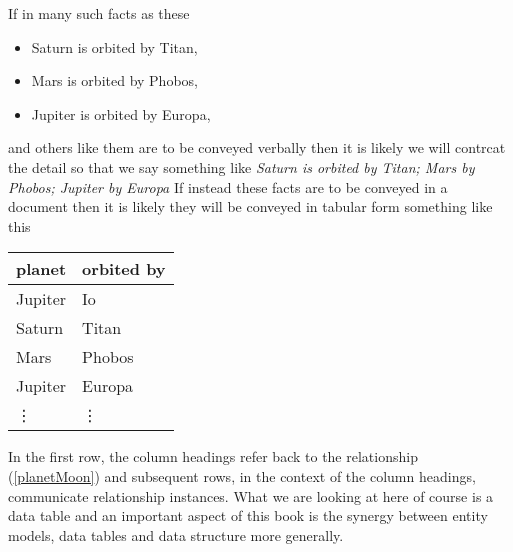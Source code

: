 If in  many such facts as these
\begin{itemize}
\renewcommand\labelitemi{--} 
\item Saturn is orbited by Titan, 
\item Mars is orbited by Phobos, 
\item Jupiter is orbited by Europa,
\end{itemize}
and others like them are to be conveyed verbally then it is likely we will contrcat the detail so that we say something like
\textit{Saturn is orbited by Titan; Mars by Phobos; Jupiter by Europa}
If instead  these facts are to be conveyed in a document then
it is likely they will be conveyed in tabular form something like this
\begin{center}
\begin{tabular}{|l | l|}
\hline
planet & orbited by \\
\hline\hline
Jupiter  & Io \\
\hline
Saturn   & Titan    \\
\hline
Mars     & Phobos    \\
\hline
Jupiter  & Europa         \\
\hline
\vdots    & \vdots  \\
\hline
\end{tabular}
\end{center}
In the first row, 
the column headings refer  back to the relationship (\ref{planetMoon})
and subsequent rows, in the context of the column headings, communicate relationship instances. 
What we are looking at here of course is a data table and an important aspect of this book is the synergy between  entity models, data tables and data structure more generally.

